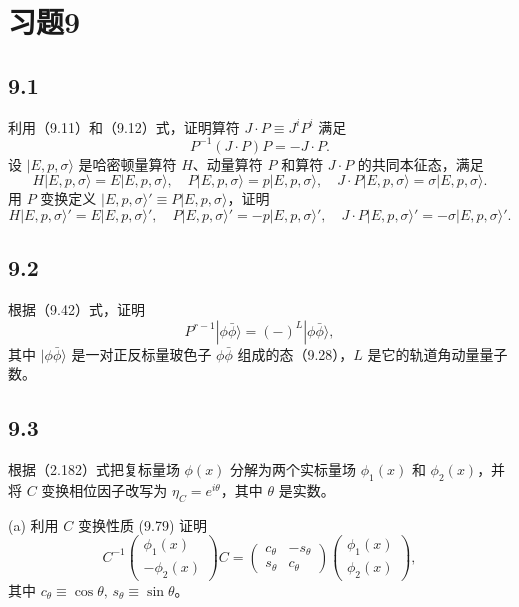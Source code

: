 \section{习题9}

\newpage
\subsection{9.1}
利用（9.11）和（9.12）式，证明算符 $J \cdot P \equiv J^i P^i$ 满足
$$P^{-1}(J \cdot P)P = -J \cdot P. \tag{9.545}$$
设 $|E, p, \sigma\rangle$ 是哈密顿量算符 $H$、动量算符 $P$ 和算符 $J \cdot P$ 的共同本征态，满足
$$H | E, p, \sigma \rangle = E | E, p, \sigma \rangle, \quad P | E, p, \sigma \rangle = p | E, p, \sigma \rangle, \quad J \cdot P | E, p, \sigma \rangle = \sigma | E, p, \sigma \rangle. \tag{9.546}$$
用 $P$ 变换定义 $|E, p, \sigma \rangle' \equiv P | E, p, \sigma \rangle$，证明
$$H | E, p, \sigma \rangle' = E | E, p, \sigma \rangle', \quad P | E, p, \sigma \rangle' = -p | E, p, \sigma \rangle', \quad J \cdot P | E, p, \sigma \rangle' = -\sigma | E, p, \sigma \rangle'. \tag{9.547}$$

\newpage
\subsection{9.2}
根据（9.42）式，证明
$$P^{r-1} | \phi \bar{\phi} \rangle = (-)^L | \phi \bar{\phi} \rangle, \tag{9.548}$$
其中 $|\phi \bar{\phi}\rangle$ 是一对正反标量玻色子 $\phi \bar{\phi}$ 组成的态（9.28），$L$ 是它的轨道角动量量子数。

\newpage
\subsection{9.3}
根据（2.182）式把复标量场 $\phi(x)$ 分解为两个实标量场 $\phi_1(x)$ 和 $\phi_2(x)$，并将 $C$ 变换相位因子改写为 $\eta_C = e^{i\theta}$，其中 $\theta$ 是实数。

(a) 利用 $ C $ 变换性质 (9.79) 证明
$$C^{-1} \begin{pmatrix}
\phi_1(x) \\
-\phi_2(x)
\end{pmatrix} C = \begin{pmatrix}
c_\theta & -s_\theta \\
s_\theta & c_\theta
\end{pmatrix} \begin{pmatrix}
\phi_1(x) \\
\phi_2(x)
\end{pmatrix}, \tag{9.549}$$
其中 $ c_\theta \equiv \cos \theta, \, s_\theta \equiv \sin \theta $。

